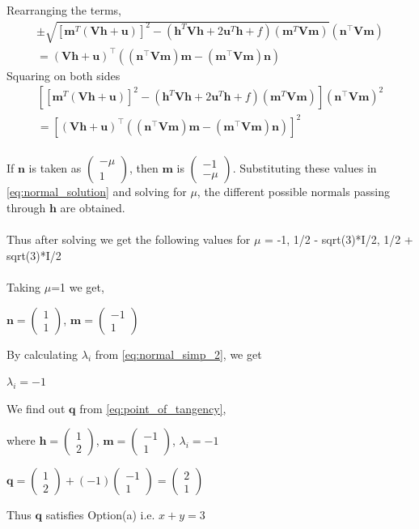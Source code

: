 \documentclass[journal,10pt,twocolumn]{article}
\let\vec\mathbf
\newcommand{\myvec}[1]{\ensuremath{\begin{pmatrix}#1\end{pmatrix}}}
\providecommand{\brak}[1]{\ensuremath{\left(#1\right)}}
\providecommand{\sbrak}[1]{\ensuremath{{}\left[#1\right]}}
\begin{document}
Rearranging the terms,
{\tiny
\begin{multline}
	\pm \sqrt{\sbrak{\vec{m}^T\brak{\vec{V}\vec{h}+\vec{u}}}^2-\brak{\vec{h}^T\vec{V}\vec{h} + 2\vec{u}^T\vec{h} +f}\brak{\vec{m}^T\vec{V}\vec{m}}} \brak{\vec{n}^\top\vec{V}\vec{m}} \\ = \brak{\vec{Vh}+\vec{u}}^\top\brak{\brak{\vec{n}^\top\vec{V}\vec{m}}\vec{m}-\brak{\vec{m}^\top\vec{V}\vec{m}}\vec{n}}
\end{multline}
}
Squaring on both sides
{\tiny
\begin{multline}
	\sbrak{\sbrak{\vec{m}^T\brak{\vec{V}\vec{h}+\vec{u}}}^2-\brak{\vec{h}^T\vec{V}\vec{h} + 2\vec{u}^T\vec{h} +f}\brak{\vec{m}^T\vec{V}\vec{m}}}\brak{\vec{n}^\top\vec{V}\vec{m}}^2 \\ = \sbrak{\brak{\vec{Vh}+\vec{u}}^\top\brak{\brak{\vec{n}^\top\vec{V}\vec{m}}\vec{m}-\brak{\vec{m}^\top\vec{V}\vec{m}}\vec{n}}}^2
	\label{eq:normal_solution}
\end{multline}
}\\
If $\vec{n}$ is taken as $\myvec{-\mu \\ 1}$, then $\vec{m}$ is $\myvec{-1 \\ -\mu}$. Substituting these values in \eqref{eq:normal_solution} and solving for $\mu$, the different possible normals passing through $\vec{h}$ are obtained.\\\\
Thus after solving we get the following values for $\mu$ = {-1, 1/2 - sqrt(3)*I/2, 1/2 + sqrt(3)*I/2}\\\\
Taking $\mu$=1 we get,
\begin{center}
$\vec{n} = \myvec{1 \\ 1}$, $\vec{m} = \myvec{-1 \\ 1}$\\
\end{center}
By calculating $\lambda_i$ from \eqref{eq:normal_simp_2}, we get
\begin{center}
    $\lambda_i = -1$
\end{center}
We find out $\vec{q}$ from \eqref{eq:point_of_tangency},
\begin{center}
where $\vec{h} = \myvec{1 \\ 2}$, $\vec{m} = \myvec{-1 \\ 1}$, $\lambda_i = -1$
\end{center}
\begin{center}
    $\vec{q} = \myvec{1 \\ 2} + (-1)\myvec{-1 \\ 1} = $\myvec{2 \\ 1}
\end{center}
\begin{center}
    Thus $\vec{q}$ satisfies Option(a) i.e. $x+y=3$
\end{center} 
\end{document}
